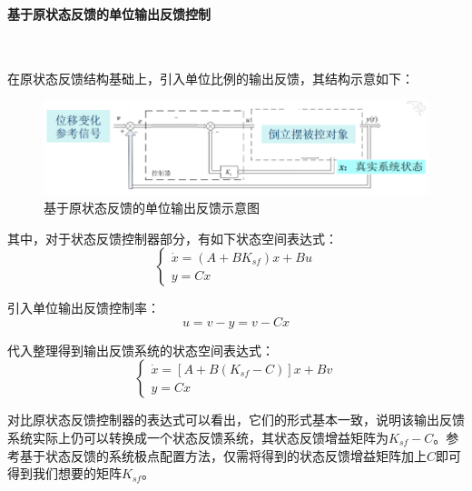 \documentclass[UTF8]{article}
\begin{document}
\paragraph{基于原状态反馈的单位输出反馈控制}~{}


在原状态反馈结构基础上，引入单位比例的输出反馈，其结构示意如下：
\begin{figure}[H]
    \centering %
    \includegraphics[width=.6\textwidth]{figure/倒立摆-输出反馈示意图.png} 
    \caption{基于原状态反馈的单位输出反馈示意图} %
\end{figure}
其中，对于状态反馈控制器部分，有如下状态空间表达式：
\begin{equation*}
	\begin{cases}
		\dot{x} = (A + BK_{sf})x + Bu \\
		y = Cx
	\end{cases}
\end{equation*}

引入单位输出反馈控制率：
\begin{equation*}
	u = v - y = v - Cx
\end{equation*}

代入整理得到输出反馈系统的状态空间表达式：
\begin{equation*}
	\begin{cases}
		\dot{x} = [A + B(K_{sf} - C)]x + Bv \\
		y = Cx
		\end{cases}
\end{equation*}

对比原状态反馈控制器的表达式可以看出，它们的形式基本一致，说明该输出反馈系统实际上仍可以转换成一个状态反馈系统，其状态反馈增益矩阵为$K_{sf} - C$。参考基于状态反馈的系统极点配置方法，仅需将得到的状态反馈增益矩阵加上$C$即可得到我们想要的矩阵$K_{sf}$。
\end{document}
